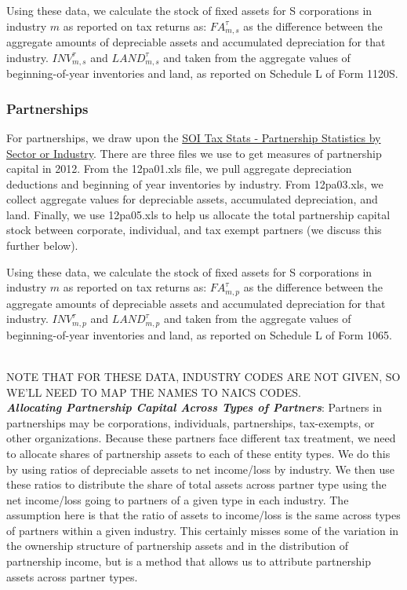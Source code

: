 \documentclass[article,11pt,letterpaper,fleqn]{article}
\theoremstyle{definition}
\numberwithin{equation}{section}
\begin{document}
Using these data, we calculate the stock of fixed assets for S corporations in industry $m$ as reported on tax returns as: ${FA}^{\tau}_{m,s}$ as the difference between the aggregate amounts of depreciable assets and accumulated depreciation for that industry.  ${INV}^{\tau}_{m,s}$ and ${LAND}^{\tau}_{m,s}$ and taken from the aggregate values of beginning-of-year inventories and land, as reported on Schedule L of Form 1120S.

\subsubsection{Partnerships}

For partnerships, we draw upon the \href{http://www.irs.gov/uac/SOI-Tax-Stats-Partnership-Statistics-by-Sector-or-Industry}{SOI Tax Stats - Partnership Statistics by Sector or Industry}.  There are three files we use to get measures of partnership capital in 2012.  From the 12pa01.xls file, we pull aggregate depreciation deductions and beginning of year inventories by industry.  From 12pa03.xls, we collect aggregate values for depreciable assets, accumulated depreciation, and land.  Finally, we use 12pa05.xls to help us allocate the total partnership capital stock between corporate, individual, and tax exempt partners (we discuss this further below).

Using these data, we calculate the stock of fixed assets for S corporations in industry $m$ as reported on tax returns as: ${FA}^{\tau}_{m,p}$ as the difference between the aggregate amounts of depreciable assets and accumulated depreciation for that industry.  ${INV}^{\tau}_{m,p}$ and ${LAND}^{\tau}_{m,p}$ and taken from the aggregate values of beginning-of-year inventories and land, as reported on Schedule L of Form 1065.

\ \\
NOTE THAT FOR THESE DATA, INDUSTRY CODES ARE NOT GIVEN, SO WE'LL NEED TO MAP THE NAMES TO NAICS CODES.
\ \\
 
\textbf{\emph{Allocating Partnership Capital Across Types of Partners}}: Partners in partnerships may be corporations, individuals, partnerships, tax-exempts, or other organizations.  Because these partners face different tax treatment, we need to allocate shares of partnership assets to each of these entity types.  We do this by using ratios of depreciable assets to net income/loss by industry.  We then use these ratios to distribute the share of total assets across partner type using the net income/loss going to partners of a given type in each industry.  The assumption here is that the ratio of assets to income/loss is the same across types of partners within a given industry.  This certainly misses some of the variation in the ownership structure of partnership assets and in the distribution of partnership income, but is a method that allows us to attribute partnership assets across partner types.
\end{document}
